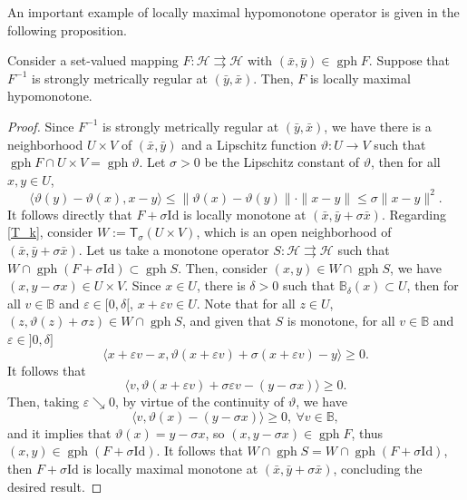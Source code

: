\documentclass[smallextended,envcountsect,envcountsame]{svjour3}
\renewcommand{\H}{\mathcal{H}}
\newcommand{\tto}{\rightrightarrows}
\newcommand{\gph}{\operatorname{gph}}
\renewcommand{\epsilon}{\varepsilon}
\newcommand{\1}{\mathds{1}}
\begin{document}
	An important example of locally maximal hypomonotone operator is given in the following proposition.
	\begin{proposition}\label{prop-lips-max-hypo}
		Consider a set-valued mapping $F\colon \H\tto \H$ with $(\bar x,\bar y)\in \gph F$. Suppose that $F^{-1}$ is strongly metrically regular at $(\bar y,\bar x)$. Then, $F$ is locally maximal hypomonotone.
	\end{proposition} 
	\begin{proof}
		Since $F^{-1}$ is strongly metrically regular at $(\bar y,\bar x)$, we have there is a neighborhood $U\times V$ of $(\bar x,\bar y)$ and a Lipschitz function $\vartheta\colon U\to V$ such that $\gph F\cap U\times V = \gph \vartheta$. Let $\sigma>0$ be the Lipschitz constant of $\vartheta$, then for all $x,y\in U$, 
		\begin{equation*}\label{eqn_lips_hypo}
			\langle \vartheta(y)-\vartheta(x),x-y\rangle\leq \| \vartheta(x)-\vartheta(y)\|\cdot \|x-y\|\leq \sigma\|x-y\|^2.
		\end{equation*}
		It follows directly that $F+\sigma\text{Id}$ is locally monotone at $(\bar x,\bar y + \sigma \bar x)$. Regarding \eqref{T_k}, consider $W := \mathsf{T}_{\sigma}(U\times V)$, which is an open neighborhood of $(\bar x,\bar y + \sigma \bar x)$. Let us take a monotone operator $S\colon \H\tto \H$ such that $W\cap \gph (F+\sigma\text{Id})\subset \gph S$. Then, consider $(x,y)\in W\cap \gph S$, we have $(x,y-\sigma x)\in U\times V$. Since $x\in U$, there is $\delta>0$ such that $\mathbb{B}_\delta(x)\subset U$, then for all $v\in \mathbb{B}$ and $\epsilon\in [0,\delta[$, $x+\epsilon v\in U$. Note that for all $z\in U$, $(z,\vartheta(z)+\sigma z)\in W\cap \gph S$, and given that $S$ is monotone, for all $v\in \mathbb{B}$ and $\epsilon\in ]0,\delta]$
		\begin{equation*}
			\langle x+\epsilon v-x,\vartheta(x+\epsilon v)+\sigma (x+\epsilon v) -y \rangle\geq 0.
		\end{equation*}
		It follows that
		\begin{equation*}
			\langle v,\vartheta(x+\epsilon v) + \sigma\epsilon v-(y-\sigma x)\rangle\geq 0.
		\end{equation*}
		Then, taking $\epsilon\searrow 0$, by virtue of the continuity of $\vartheta$, we have $$\langle v,\vartheta(x)-(y-\sigma x)\rangle\geq 0, \ \forall v\in \mathbb{B},$$ and it implies that $\vartheta(x) = y-\sigma x$, so $(x,y-\sigma x)\in \gph F$, thus $(x,y)\in \gph(F+\sigma\text{Id})$. It follows that $W\cap \gph S = W\cap \gph (F+\sigma\text{Id})$, then $F+\sigma \text{Id}$ is locally maximal monotone at $(\bar x,\bar y+\sigma \bar x)$, concluding the desired result.
	\end{proof}
    
\end{document}
